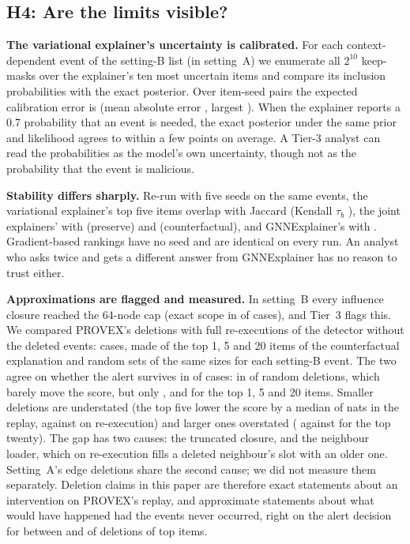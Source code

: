 \documentclass[conference]{IEEEtran}
\begin{document}
\subsection{H4: Are the limits visible?}
\textbf{The variational explainer's uncertainty is calibrated.} For each context-dependent event of the
setting-B list (in setting~A) we enumerate all $2^{10}$ keep-masks over the explainer's ten most uncertain
items and compare its inclusion probabilities with the exact posterior. Over \CalPairs{} item-seed pairs the
expected calibration error is \CalECE{} (mean absolute error \CalMeanErr{}, largest \CalMaxErr{}). When
the explainer reports a 0.7 probability that an event is needed, the exact posterior under the same
prior and likelihood agrees to within a few points on average. A Tier-3 analyst can read the probabilities as
the model's own uncertainty, though not as the probability that the event is malicious.

\textbf{Stability differs sharply.} Re-run with five seeds on the same events, the variational explainer's
top five items overlap with Jaccard \StabVariationalJaccard{} (Kendall $\tau_b$
\StabVariationalKendall{}), the joint explainers' with \StabJointJaccard{} (preserve) and
\StabJointCFJaccard{} (counterfactual), and GNNExplainer's with \StabGnnxAnomalyJaccard{}. Gradient-based
rankings have no seed and are identical on every run. An analyst who asks twice and gets a different answer
from GNNExplainer has no reason to trust either.

\textbf{Approximations are flagged and measured.} In setting~B every influence closure reached the
64-node cap (exact scope in \EsevenExact{} of cases), and Tier~3 flags this. We compared PROVEX's deletions
with full re-executions of the detector without the deleted events: \EsevenN{} cases, made of the top 1, 5
and 20 items of the counterfactual explanation and random sets of the same sizes for each setting-B event.
The two agree on whether the alert survives in \EsevenFlipAgree{} of cases: in \EsevenRandomFiveAgree{} of
random deletions, which barely move the score, but only \EsevenTopOneAgree{}, \EsevenTopFiveAgree{} and
\EsevenTopTwentyAgree{} for the top 1, 5 and 20 items. Smaller deletions are understated (the top five
lower the score by a median of \EsevenTopFiveDropReplay{} nats in the replay, against
\EsevenTopFiveDropFull{} on re-execution) and larger ones overstated (\EsevenTopTwentyDropReplay{} against
\EsevenTopTwentyDropFull{} for the top twenty). The gap has two causes: the truncated closure, and the
neighbour loader, which on re-execution fills a deleted neighbour's slot with an older one. Setting~A's
edge deletions share the second cause; we did not measure them separately. Deletion claims in this paper
are therefore exact statements about an intervention on PROVEX's replay, and approximate statements about
what would have happened had the events never occurred, right on the alert decision for between
\EsevenTopFiveAgree{} and \EsevenTopOneAgree{} of deletions of top items.
\end{document}
